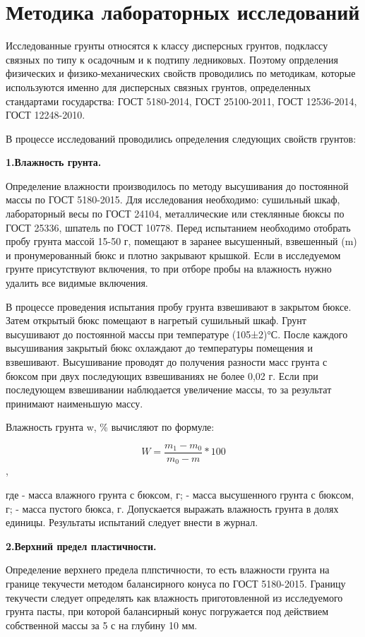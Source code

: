 \chapter*{Методика лабораторных исследований}

Исследованные грунты относятся к классу дисперсных грунтов, подклассу связных по типу 
к осадочным и к подтипу ледниковых. 
Поэтому опрделения физических и физико-механических свойств проводились по методикам, 
которые используются именно для дисперсных связных грунтов, определенных 
стандартами государства: ГОСТ 5180-2014, ГОСТ 25100-2011, ГОСТ 12536-2014, ГОСТ 12248-2010.

В процессе исследований проводились определения следующих свойств грунтов:

\textbf{1.Влажность грунта.}

Определение влажности производилось по методу высушивания до постоянной массы по ГОСТ 5180-2015. 
Для исследования необходимо: сушильный шкаф, лабораторный весы по ГОСТ 24104, 
металлические или стеклянные бюксы по ГОСТ 25336, шпатель по ГОСТ 10778. 
Перед испытанием необходимо отобрать пробу грунта массой 15-50 г, 
помещают в заранее высушенный, взвешенный (m) и пронумерованный бюкс и плотно закрывают крышкой. 
Если в исследуемом грунте присутствуют включения, 
то при отборе пробы на влажность нужно удалить все видимые включения.

В процессе проведения испытания пробу грунта взвешивают в закрытом бюксе. Затем открытый бюкс 
помещают в нагретый сушильный шкаф. Грунт
высушивают до постоянной массы при температуре (105±2)°С. После каждого высушивания закрытый бюкс 
охлаждают до температуры помещения и взвешивают.
Высушивание проводят до получения разности масс грунта с бюксом при двух последующих взвешиваниях 
не более 0,02 г. Если при последующем взвешивании 
наблюдается увеличение массы, то за результат принимают наименьшую массу.

Влажность грунта w, \% вычисляют по формуле:

\[
   W = \frac{m_1-m_0}{m_0-m}*100
\]
,

где - масса влажного грунта с бюксом, г;
- масса высушенного грунта с бюксом, г;
- масса пустого бюкса, г.
Допускается выражать влажность грунта в долях единицы.
Результаты испытаний следует внести в журнал.

\textbf{2.Верхний предел пластичности.}

Определение верхнего предела плпстичности, то есть влажности грунта на границе текучести 
методом балансирного конуса по ГОСТ 5180-2015.
Границу текучести следует определять как влажность приготовленной из исследуемого грунта пасты, 
при которой балансирный конус погружается
под действием собственной массы за 5 с на глубину 10 мм.

